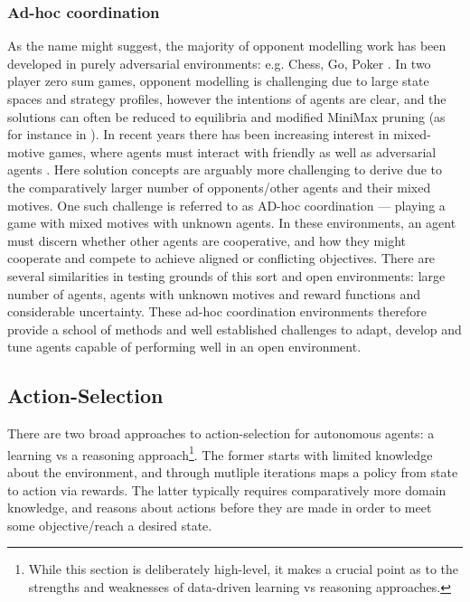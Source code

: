 \subsubsection{Ad-hoc coordination}
As the name might suggest, the majority of opponent modelling work has been developed in purely adversarial environments: e.g. Chess, Go, Poker \cite{Brown2017,Brown2020,AlphaGo}. In two player zero sum games, opponent modelling is challenging due to large state spaces and strategy profiles, however the intentions of agents are clear, and the solutions can often be reduced to equilibria and modified MiniMax pruning (as for instance in \cite{Brown2020}). 
\newline \newline
In recent years there has been increasing interest in mixed-motive games, where agents must interact with friendly as well as adversarial agents \cite{Barrett2017}. Here solution concepts are arguably more challenging to derive due to the comparatively larger number of opponents/other agents and their mixed motives. One such challenge is referred to as AD-hoc coordination --- playing a game with mixed motives with unknown agents. In these environments, an agent must discern whether other agents are cooperative, and how they might cooperate and compete to achieve aligned or conflicting objectives.
\newline \newline
There are several similarities in testing grounds of this sort and open environments: large number of agents, agents with unknown motives and reward functions and considerable uncertainty. These ad-hoc coordination environments therefore provide a school of methods and well established challenges to adapt, develop and tune agents capable of performing well in an open environment. 

\subsection{Action-Selection}
There are two broad approaches to action-selection for autonomous agents: a learning vs a reasoning approach\footnote{While this section is deliberately high-level, it makes a crucial point as to the strengths and weaknesses of data-driven learning vs reasoning approaches.}. The former starts with limited knowledge about the environment, and through mutliple iterations maps a policy from state to action via rewards. The latter typically requires comparatively more domain knowledge, and reasons about actions before they are made in order to meet some objective/reach a desired state. 
